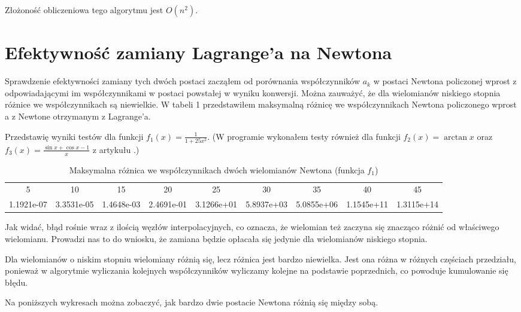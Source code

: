 \documentclass[a4paper]{article}
\begin{document}
Złożoność obliczeniowa tego algorytmu jest $O(n^2)$.

\section{Efektywność zamiany Lagrange'a na Newtona}
Sprawdzenie efektywności zamiany tych dwóch postaci zacząłem od porównania współczynników $a_k$ w
postaci Newtona policzonej wprost z odpowiadającymi im współczynnikami w postaci powstałej w wyniku
konwersji. Można zauważyć, że dla wielomianów niskiego stopnia różnice we współczynnikach są 
niewielkie. W tabeli 1 przedstawiłem maksymalną różnicę we współczynnikach Newtona policzonego wprost
a z Newtone otrzymanym z Lagrange'a.

Przedstawię wyniki testów dla funkcji $f_1(x) = \frac{1}{1+25x^2}$. (W programie wykonałem testy
również dla funkcji $f_2(x) = \arctan{x}$ oraz $f_3(x) = \frac{\sin{x} + \cos{x} - 1}{x}$ z 
artykułu \cite{1}.)


\begin{table}[!h]
  \centering
\begin{tabular}{|c||c||c||c||c||c||c||c||c|}
  \hline
     5     &    10      &    15      &    20      &    25      &    30      &    35      &    40      &    45      \\
1.1921e-07 & 3.3531e-05 & 1.4648e-03 & 2.4691e-01 & 3.1266e+01 & 5.8937e+03 & 5.0855e+06 & 1.1545e+11 & 1.3115e+14 \\
  \hline 
\end{tabular}
\caption{Maksymalna różnica we współczynnikach dwóch wielomianów Newtona (funkcja $f_1$)}
\end{table}

Jak widać, błąd rośnie wraz z ilością węzłów interpolacyjnych, co oznacza, że wielomian też zaczyna
się znacząco różnić od właściwego wielomianu. Prowadzi nas to do wniosku, że zamiana będzie 
opłacała się jedynie dla wielomianów niskiego stopnia.

Dla wielomianów o niskim stopniu wielomiany różnią się, lecz różnica jest bardzo niewielka. Jest ona 
różna w różnych częściach przedziału, ponieważ w algorytmie wyliczania kolejnych współczynników 
wyliczamy kolejne na podstawie poprzednich, co powoduje kumulowanie się błędu.

Na poniższych wykresach można zobaczyć, jak bardzo dwie postacie Newtona różnią się między sobą.
\end{document}
